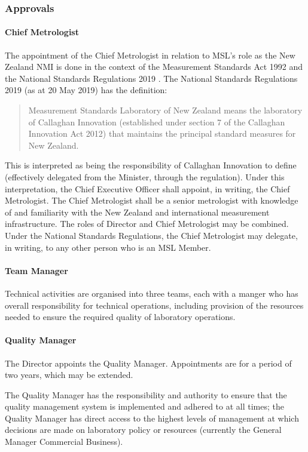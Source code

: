 \subsubsection{Approvals}
\paragraph{Chief Metrologist}    

The appointment of the Chief Metrologist in relation to MSL's role as the New Zealand NMI is done in the context of the Measurement Standards Act 1992 \cite{MS_ACT_1992} and the National Standards Regulations 2019 \cite{NS_Regulations}.
The National Standards Regulations 2019 (as at 20 May 2019) has the definition:
\begin{quote}
Measurement Standards Laboratory of New Zealand means the laboratory of Callaghan 
Innovation (established under section 7 of the Callaghan Innovation Act 2012) that maintains 
the principal standard measures for New Zealand.
\end{quote}
This is interpreted as being the responsibility of Callaghan Innovation to define (effectively delegated from the Minister, through the regulation). Under this interpretation, the Chief Executive Officer shall appoint, in writing, the Chief Metrologist. The Chief Metrologist shall be a senior metrologist with knowledge of and familiarity with the New Zealand and international measurement infrastructure. The roles of Director and Chief Metrologist may be combined.
Under the National Standards Regulations, the Chief Metrologist may delegate, in writing, to any other person who is an MSL Member.
\paragraph{Team Manager}
Technical activities are organised into three teams, each with a manger who has overall responsibility for technical operations, including provision of the resources needed to ensure the required quality of laboratory operations. 
\paragraph{Quality Manager}
The Director appoints the Quality Manager. Appointments are for a period of two years, which may be extended. 

The Quality Manager has the responsibility and authority to ensure that the quality management system is implemented and adhered to at all times; the Quality Manager has direct access to the highest levels of management at which decisions are made on laboratory policy or resources (currently the General Manager Commercial Business).

